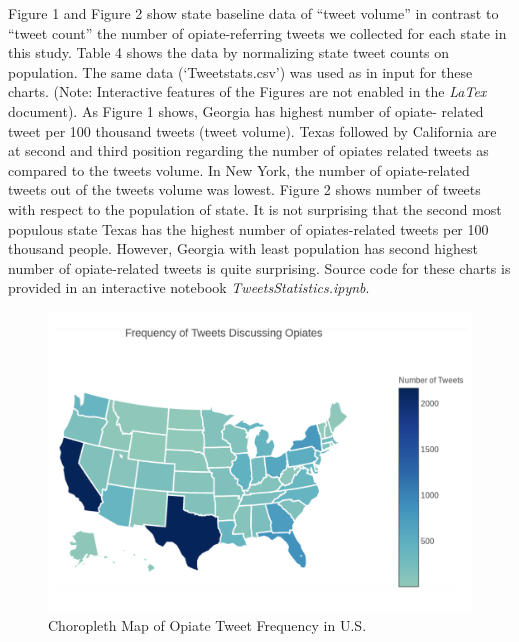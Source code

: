 \documentclass[sigconf]{acmart}
\begin{document}
Figure 1 and Figure 2 show state baseline data of ``tweet volume'' in contrast 
to ``tweet count'' the number of opiate-referring tweets we collected for each 
state in this study. Table 4 shows the data by normalizing state tweet counts 
on population. The same data (`Tweetstats.csv') was used as in input for these 
charts. (Note: Interactive features of the Figures are not enabled in the 
\emph{LaTex} document). As Figure 1 shows, Georgia has highest number of opiate-
related tweet per 100 thousand tweets (tweet volume). Texas followed by 
California are at second and third position regarding the number of opiates 
related tweets as compared to the tweets volume. In New York, the number of 
opiate-related tweets out of the tweets volume was lowest. Figure 2 shows number 
of tweets with respect to the population of state. It is not surprising that the 
second most populous state Texas has the highest number of opiates-related tweets 
per 100 thousand people. However, Georgia with least population has second highest 
number of opiate-related tweets is quite surprising. Source code for these 
charts is provided in an interactive notebook \emph{TweetsStatistics.ipynb}. 

\begin{figure}[!ht]
  \centering\includegraphics[width=\columnwidth]{images/Figure3.pdf}
  \caption{Choropleth Map of Opiate Tweet Frequency in U.S.}
  \label{f:Figure3}
\end{figure}
\end{document}
